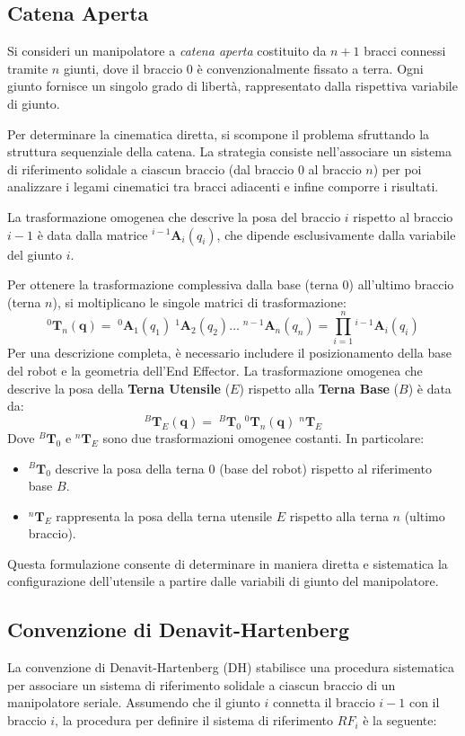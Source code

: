 \documentclass[11pt, a4paper]{report}
\begin{document}
\newpage
\subsection{Catena Aperta}
Si consideri un manipolatore a \textit{catena aperta} costituito da $n+1$ bracci connessi tramite $n$ giunti, dove il braccio $0$ è convenzionalmente fissato a terra. Ogni giunto fornisce un singolo grado di libertà, rappresentato dalla rispettiva variabile di giunto.

Per determinare la cinematica diretta, si scompone il problema sfruttando la struttura sequenziale della catena. La strategia consiste nell'associare un sistema di riferimento solidale a ciascun braccio (dal braccio $0$ al braccio $n$) per poi analizzare i legami cinematici tra bracci adiacenti e infine comporre i risultati.

La trasformazione omogenea che descrive la posa del braccio $i$ rispetto al braccio $i-1$ è data dalla matrice $^{i-1}\mathbf{A}_{i}(q_{i})$, che dipende esclusivamente dalla variabile del giunto $i$.

Per ottenere la trasformazione complessiva dalla base (terna $0$) all'ultimo braccio (terna $n$), si moltiplicano le singole matrici di trasformazione:
\[
    ^{0}\mathbf{T}_{n}(\mathbf{q}) = \; ^{0}\mathbf{A}_{1}(q_{1}) \; ^{1}\mathbf{A}_{2}(q_{2}) \dots \; ^{n-1}\mathbf{A}_{n}(q_{n}) = \prod_{i=1}^{n} {}^{i-1}\mathbf{A}_{i}(q_{i})
\]
Per una descrizione completa, è necessario includere il posizionamento della base del robot e la geometria dell'End Effector. La trasformazione omogenea che descrive la posa della \textbf{Terna Utensile} ($E$) rispetto alla \textbf{Terna Base} ($B$) è data da:
\[
    ^{B}\mathbf{T}_{E}(\mathbf{q}) = \; ^{B}\mathbf{T}_{0} \; ^{0}\mathbf{T}_{n}(\mathbf{q}) \; ^{n}\mathbf{T}_{E}
\]
Dove $^{B}\mathbf{T}_{0}$ e $^{n}\mathbf{T}_{E}$ sono due trasformazioni omogenee costanti. In particolare:
\begin{itemize}
    \item $^{B}\mathbf{T}_{0}$ descrive la posa della terna $0$ (base del robot) rispetto al riferimento base $B$.
    \item $^{n}\mathbf{T}_{E}$ rappresenta la posa della terna utensile $E$ rispetto alla terna $n$ (ultimo braccio).
\end{itemize}
Questa formulazione consente di determinare in maniera diretta e sistematica la configurazione dell'utensile a partire dalle variabili di giunto del manipolatore.
\newpage
\subsection{Convenzione di Denavit-Hartenberg}
La convenzione di Denavit-Hartenberg (DH) stabilisce una procedura sistematica per associare un sistema di riferimento solidale a ciascun braccio di un manipolatore seriale. Assumendo che il giunto \(i\) connetta il braccio \(i-1\) con il braccio \(i\), la procedura per definire il sistema di riferimento \(RF_{i}\) è la seguente:
\end{document}
